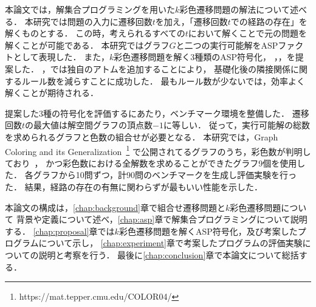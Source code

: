 本論文では，解集合プログラミングを用いた$k$彩色遷移問題の解法について述べる．
本研究では問題の入力に遷移回数$t$を加え，「遷移回数$t$での経路の存在」を解くものとする．
この時，考えられるすべての$t$において解くことで元の問題を解くことが可能である．
本研究ではグラフ$G$と二つの実行可能解をASPファクトとして表現した．
また，$k$彩色遷移問題を解く3種類のASP符号化，
，，を提案した．
，では独自のアトムを追加することにより，
基礎化後の隣接関係に関するルール数を減らすことに成功した．
最もルール数が少ないでは，効率よく解くことが期待される．

提案した3種の符号化を評価するにあたり，ベンチマーク環境を整備した．
遷移回数$t$の最大値は解空間グラフの頂点数$-1$に等しい．
従って，実行可能解の総数を求められるグラフと色数の組合せが必要となる．
本研究では，Graph Coloring and its Generalization~\footnote{https://mat.tepper.cmu.edu/COLOR04/}
で公開されてるグラフのうち，彩色数が判明しており~\cite{DBLP:journals/constraints/TamuraTKB09}，
かつ彩色数における全解数を求めることができたグラフ9個を使用した．
各グラフから10問ずつ，計90問のベンチマークを生成し評価実験を行った．
結果，経路の存在の有無に関わらずが最もいい性能を示した．

本論文の構成は，\ref{chap:background}章で組合せ遷移問題と$k$彩色遷移問題について
背景や定義について述べ，\ref{chap:asp}章で解集合プログラミングについて説明する．
\ref{chap:proposal}章では$k$彩色遷移問題を解くASP符号化，及び考案したプログラムについて示し，
\ref{chap:experiment}章で考案したプログラムの評価実験についての説明と考察を行う．
最後に\ref{chap:conclusion}章で本論文について総括する．

